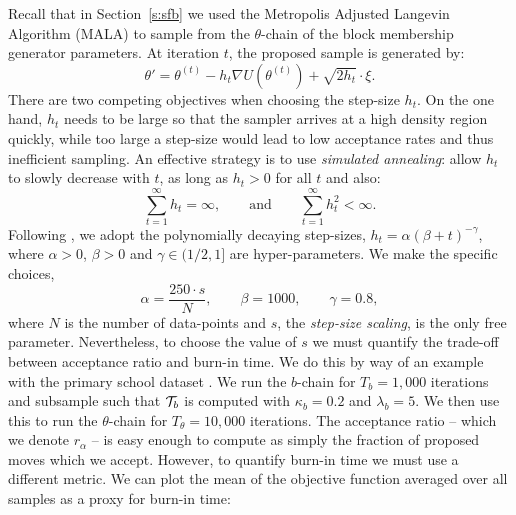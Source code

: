 Recall that in 
Section~\ref{s:sfb} we used 
the Metropolis Adjusted Langevin Algorithm (MALA)
to 
sample from the $\theta$-chain of the block membership 
generator parameters.
At iteration $t$, the proposed sample is generated by:
%
\begin{equation}
	\theta' = \theta^{(t)} - h_t \nabla U(\theta^{(t)}) + \sqrt{2h_t} \cdot \xi.
\end{equation}
%
There are two competing objectives when choosing the step-size $h_t$. 
On the one hand, $h_t$ needs to be large so that the sampler
arrives at a high density region quickly,
while too large a step-size would lead to low acceptance rates and thus 
inefficient sampling. An effective strategy is
to use {\em simulated annealing}: allow $h_t$ to slowly decrease
with $t$, as long as $h_t>0$ for all $t$ and also:
%
\begin{equation}
	\sum_{t=1}^{\infty} h_t = \infty, \qquad \textrm{and} \qquad
	\sum_{t=1}^{\infty} h_t^2 < \infty.
	\label{eqn:h-constraints}
\end{equation}
%
Following \citet{Bayesian-SGLD}, we adopt the 
polynomially decaying step-sizes,
%
$h_t = \alpha(\beta + t)^{-\gamma}$,
%
where $\alpha>0$, $\beta>0$ and $\gamma\in(1/2,1]$ are hyper-parameters.
We make the specific choices,
%
\begin{equation}
	\alpha = \frac{250 \cdot s}{N}, \qquad \beta = 1000, \qquad \gamma = 0.8,
	\label{eqn:step-size-params}
\end{equation}
%
where $N$ is the number of data-points and $s$,
the {\em step-size scaling}, is the only free parameter.
%
%
Nevertheless, to choose the value of $s$ we must quantify the trade-off between acceptance ratio and burn-in time. We do this by way of an example with the primary school dataset \cite{schools}. We run the $b$-chain for $T_b = 1,000$ iterations and subsample such that $\mathcal{T}_b$ is computed with $\kappa_b=0.2$ and $\lambda_b=5$. We then use this to run the $\theta$-chain for $T_\theta = 10,000$ iterations. The acceptance ratio -- which we denote $r_\alpha$ -- is easy enough to compute as simply the fraction of proposed moves which we accept. However, to quantify burn-in time we must use a different metric. We can plot the mean of the objective function averaged over all samples as a proxy for burn-in time:
